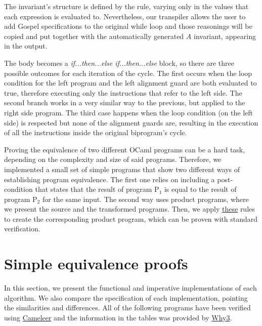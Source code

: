 The invariant's structure is defined by the rule, varying only in the values that each expression is evaluated to.
Nevertheless, our transpiler allows the user to add Gospel specifications to the original while loop and those reasonings will be copied and put together with the automatically generated $A$ invariant, appearing in the output.

The body becomes a \emph{if...then...else if...then...else} block, so there are three possible outcomes for each iteration of the cycle.
The first occurs when the loop condition for the left program and the left alignment guard are both evaluated to true, therefore executing only the instructions that refer to the left side.
The second branch works in a very similar way to the previous, but applied to the right side program.
The third case happens when the loop condition (on the left side) is respected but none of the alignment guards are, resulting in the execution of all the instructions inside the original biprogram's cycle.















\iffalse
Proving the equivalence of two different OCaml programs can be a hard task, depending on the complexity and size of said programs.
Therefore, we implemented a small set of simple programs that show two different ways of establishing program equivalence.
The first one relies on including a post-condition that states that the result of program P$_1$ is equal to the result of program P$_2$ for the same input.
The second way uses product programs, where we present the source and the transformed programs.
Then, we apply \hyperref[fig:product_construction_equal_struct]{these} rules to create the corresponding product program, which can be proven with standard verification.

\FloatBarrier
\section{Simple equivalence proofs}
\label{sec:results_eq_proofs}

In this section, we present the functional and imperative implementations of each algorithm.
We also compare the specification of each implementation, pointing the similarities and differences.
All of the following programs have been verified using \hyperref[sec:cameleer]{Cameleer} and the information in the tables was provided by \hyperref[sec:why3]{Why3}.


